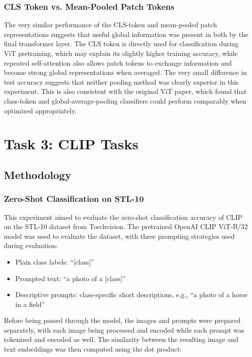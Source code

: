 \documentclass{article}
\begin{document}
\subsubsection{CLS Token vs. Mean-Pooled Patch Tokens}
The very similar performance of the CLS-token and mean-pooled patch representations suggests that useful global information was present in both by the final transformer layer. The CLS token is directly used for classification during ViT pretraining, which may explain its slightly higher training accuracy, while repeated self-attention also allows patch tokens to exchange information and become strong global representations when averaged. The very small difference in test accuracy suggests that neither pooling method was clearly superior in this experiment. This is also consistent with the original ViT paper, which found that class-token and global-average-pooling classifiers could perform comparably when optimized appropriately.

\section{Task 3: CLIP Tasks}

\subsection{Methodology}

\subsubsection{Zero-Shot Classification on STL-10}
This experiment aimed to evaluate the zero-shot classification accuracy of CLIP on the STL-10 dataset from Torchvision. The pretrained OpenAI CLIP ViT-B/32 model was used to evaluate the dataset, with three prompting strategies used during evaluation:

\begin{itemize}
    \item Plain class labels: ``[class]''
    \item Prompted text: ``a photo of a [class]''
    \item Descriptive prompts: class-specific short descriptions, e.g., ``a photo of a horse in a field''
\end{itemize}

Before being passed through the model, the images and prompts were prepared separately, with each image being processed and encoded while each prompt was tokenized and encoded as well. The similarity between the resulting image and text embeddings was then computed using the dot product:
\end{document}
